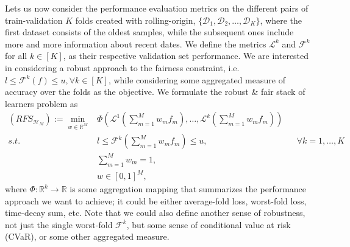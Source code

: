 \documentclass[11pt]{article}
\theoremstyle{plain}
\theoremstyle{definition}
\newcommand{\R}{\mathbb{R}}
\newcommand{\1}{\mathbf{1}}
\newcommand{\D}{\mathcal{D}}
\newcommand{\F}{\mathcal{F}}
\renewcommand{\L}{\mathcal{L}}
\renewcommand{\H}{\mathcal{H}}
\renewcommand{\R}{\mathbb{R}}
\begin{document}
{Lets us now consider the performance evaluation metrics on the different pairs of train-validation $K$ folds created with rolling-origin, $\{\D_{1}, \D_2, \ldots , \D_K\}$, where the first dataset consists of the oldest samples, while the subsequent ones include more and more information about recent dates. We define the metrics $\L^k$ and $\F^k$ for all $k\in [K]$, as their respective validation set performance. We are interested in considering a robust approach to the fairness constraint, i.e. $l \leq \F^k(f) \leq u, \forall k\in [K]$, while considering some aggregated measure of accuracy over the folds as the objective. We formulate the robust \& fair stack of learners problem as
{\everymath{\displaystyle}
\begin{equation}
\label{opt:robust_fair_stacking}
    \begin{array}{rclr}
    (RFS_{\H_M}):=   \min_{w \in \R^M}  & \Phi\left(\L^1\left(\sum_{m=1}^M  w_m f_m\right),\ldots , \L^k\left(\sum_{m=1}^M  w_m f_m \right)\right)\\
        s.t. &  l \leq \F^k\left(\sum_{m=1}^M w_mf_m\right)\leq  u, &  &  \forall k = 1,\ldots, K\\
        & \sum_{m=1}^M w_m =1, \\
       &  w \in [0,1]^M,
    \end{array}
\end{equation}
}
\hspace{-3.3mm} where $\Phi:\R^k \rightarrow \R$ is some aggregation mapping that summarizes the performance approach we want to achieve; it could be either average-fold loss, worst-fold loss, time-decay sum, etc. Note that we could also define another sense of robustness, not just the single worst-fold $\F^k$, but some sense of conditional value at risk (CVaR), or some other aggregated measure.






\newpage







}
\end{document}
